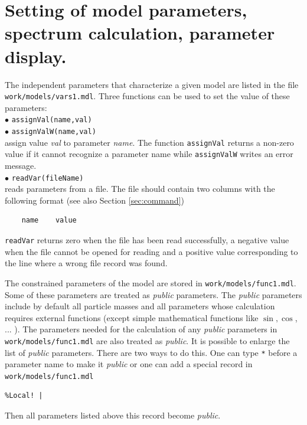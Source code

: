 \documentclass[12pt,a4paper]{article}
\begin{document}
\section{Setting of model parameters, spectrum calculation, parameter display.}
\label{setting_parameters}
The independent parameters that characterize a given model are listed in 
the file \\
\noindent
\verb|work/models/vars1.mdl|. Three functions can be used to set the
value of these parameters:\\

\noindent
$\bullet$ \verb|assignVal(name,val)|\\
$\bullet$ \verb|assignValW(name,val)|\\
assign value {\it val} to parameter {\it name}. The function  \verb|assignVal| returns a non-zero
value  if it
cannot recognize  a parameter name while \verb|assignValW| writes an error message.  \\
$\bullet$ \verb|readVar(fileName)|\\
reads parameters from a file. The file  should contain two columns with the 
 following  format (see also Section \ref{sec:command})
\begin{verbatim}
    name    value
\end{verbatim}
\verb|readVar| returns zero when
the file has been read successfully, a negative value when the
file cannot be opened for reading and  a positive  value 
corresponding to the line where a wrong file record was found.



The constrained parameters of the model are stored in \verb|work/models/func1.mdl|. Some of
these parameters are treated as {\it public} parameters. The {\it public} parameters include 
by default all particle masses 
and all parameters  whose calculation requires external functions (except simple
mathematical functions like $\sin,\cos$, ... ). The parameters needed for the calculation of any 
{\it public} parameters in  \verb|work/models/func1.mdl|
are also treated as {\it public}. 
It is possible to enlarge the list of {\it public} parameters. There are two ways to do this. 
One can type \verb|*| before a parameter name to make it {\it public} or one 
can add a  special record in \verb|work/models/func1.mdl|
\begin{verbatim}
%Local! |   
\end{verbatim}
Then all parameters listed above this record  become {\it public}. 
\end{document}
